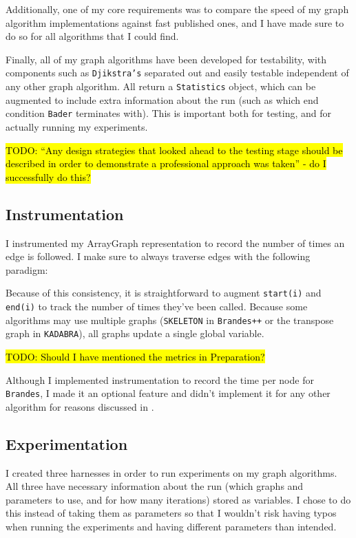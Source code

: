 \documentclass[12pt,a4paper,twoside,openright]{report}
\newcommand{\todo}[1]{\hl{TODO: #1}}
\newcommand{\ttt}[1]{\texttt{#1}}
\newcommand{\java}[1]{\ttt{#1}}
\begin{document}
		Additionally, one of my core requirements was to compare the speed of my graph algorithm implementations against fast published ones, and I have made sure to do so for all algorithms that I could find.
		
		Finally, all of my graph algorithms have been developed for testability, with components such as \ttt{Djikstra's} separated out and easily testable independent of any other graph algorithm. All return a \ttt{Statistics} object, which can be augmented to include extra information about the run (such as which end condition \ttt{Bader} terminates with). This is important both for testing, and for actually running my experiments.
		
		
		\todo{``Any design strategies that looked ahead to the testing stage should be described in order to demonstrate a professional approach was taken'' - do I successfully do this?}
		\subsection{Instrumentation}
		I instrumented my ArrayGraph representation to record the number of times an edge is followed. I make sure to always traverse edges with the following paradigm:
		
		Because of this consistency, it is straightforward to augment \java{start(i)} and \java{end(i)} to track the number of times they've been called. Because some algorithms may use multiple graphs (\ttt{SKELETON} in \ttt{Brandes++} or the transpose graph in \ttt{KADABRA}), all graphs update a single global variable.
		
		\todo{Should I have mentioned the metrics in Preparation?}
		
		Although I implemented instrumentation to record the time per node for \ttt{Brandes}, I made it an optional feature and didn't implement it for any other algorithm for reasons discussed in .
		\subsection{Experimentation}
		
		I created three harnesses in order to run experiments on my graph algorithms. All three have necessary information about the run (which graphs and parameters to use, and for how many iterations) stored as variables. I chose to do this instead of taking them as parameters so that I wouldn't risk having typos when running the experiments and having different parameters than intended.
		
\end{document}
